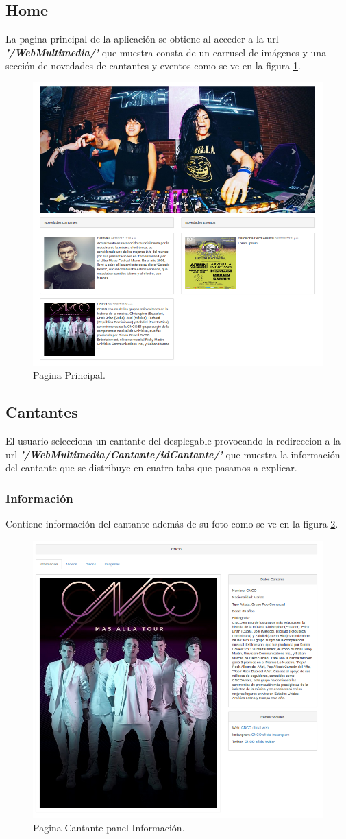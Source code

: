 \subsection*{Home}
La pagina principal de la aplicación se obtiene al acceder a la url \textit{\textbf{ '/WebMultimedia/'}} que muestra consta de un carrusel de imágenes y una sección de novedades de cantantes y eventos como se ve en la figura \ref{fig:Page_Home}.
\begin{figure}[!h]
\begin{center}
   \includegraphics[width=0.5\linewidth]{Figures/HomePage}
  \decoRule
  \caption[Pagina Principal]{Pagina Principal.}
\label{fig:Page_Home}
\end{center}
\end{figure}
\subsection*{Cantantes} 
El usuario selecciona un cantante del desplegable provocando la redireccion a la url \textit{\textbf{'/WebMultimedia/Cantante/idCantante/'}} que muestra la información del cantante que se distribuye en cuatro tabs que pasamos a explicar.
\subsubsection*{Información}
Contiene información del cantante además de su foto como se ve en la figura \ref{fig:Info_Cantante}.
\begin{figure}[!h]
\begin{center}
   \includegraphics[width=0.45\linewidth]{Figures/init_Cantante}
  \decoRule
  \caption[Cantante panel Información]{Pagina Cantante panel Información.}
\label{fig:Info_Cantante}
\end{center}
\end{figure}
